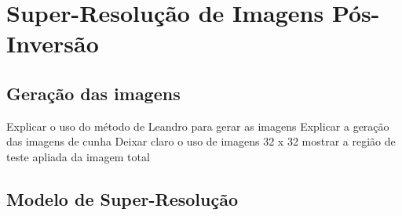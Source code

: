 \chapter{Super-Resolução de Imagens Pós-Inversão}
\label{cap:3modeloHibrido}

\section{Geração das imagens}
Explicar o uso do método de Leandro para gerar as imagens
Explicar a geração das imagens de cunha
Deixar claro o uso de imagens 32 x 32 mostrar a região de teste apliada da imagem total

\section{Modelo de Super-Resolução}
% 
% 
% 
% 
